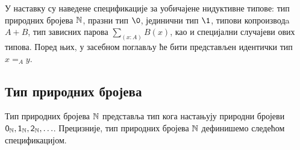 \documentclass[12pt,oneside]{memoir}
\begin{document}
У наставку су наведене спецификације за уобичајене нидуктивне типове: тип природних бројева ${\mathbb{N}}$, празни тип $\0$, јединични тип $\1$, типови копроизводa $A + B$, тип зависних парова $\sum_{(x : A)} B (x)$, као и специјални случајеви ових типова. Поред њих, у засебном поглављу ће бити представљен идентички тип $x =_{A} y$.

\newpage%

\subsection{Тип природних бројева}

Тип природних бројева ${\mathbb{N}}$ представља тип кога настањују природни бројеви $\mathsf{0}_\mathbb{N}, \mathsf{1}_\mathbb{N}, \mathsf{2}_\mathbb{N}, \ldots$. Прецизније, тип природних бројева ${\mathbb{N}}$ дефинишемо следећом спецификацијом.
\end{document}
